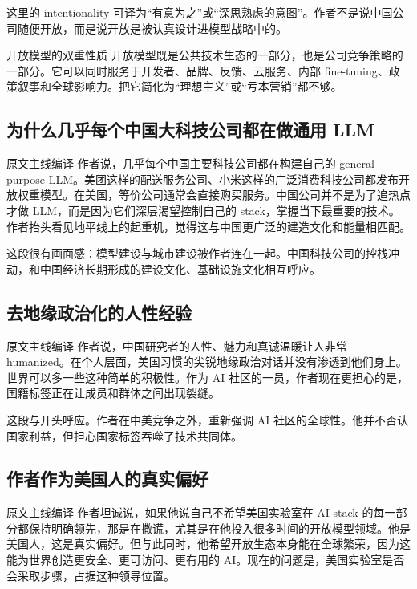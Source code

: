 这里的 intentionality 可译为``有意为之''或``深思熟虑的意图''。作者不是说中国公司随便开放，而是说开放是被认真设计进模型战略中的。

\begin{importantbox}{开放模型的双重性质}
开放模型既是公共技术生态的一部分，也是公司竞争策略的一部分。它可以同时服务于开发者、品牌、反馈、云服务、内部 fine-tuning、政策叙事和全球影响力。把它简化为``理想主义''或``亏本营销''都不够。
\end{importantbox}

\subsection{为什么几乎每个中国大科技公司都在做通用 LLM}

\begin{translationbox}{原文主线编译}
作者说，几乎每个中国主要科技公司都在构建自己的 general purpose LLM。美团这样的配送服务公司、小米这样的广泛消费科技公司都发布开放权重模型。在美国，等价公司通常会直接购买服务。中国公司并不是为了追热点才做 LLM，而是因为它们深层渴望控制自己的 stack，掌握当下最重要的技术。作者抬头看见地平线上的起重机，觉得这与中国更广泛的建造文化和能量相匹配。
\end{translationbox}

这段很有画面感：模型建设与城市建设被作者连在一起。中国科技公司的控栈冲动，和中国经济长期形成的建设文化、基础设施文化相互呼应。

\subsection{去地缘政治化的人性经验}

\begin{translationbox}{原文主线编译}
作者说，中国研究者的人性、魅力和真诚温暖让人非常 humanized。在个人层面，美国习惯的尖锐地缘政治对话并没有渗透到他们身上。世界可以多一些这种简单的积极性。作为 AI 社区的一员，作者现在更担心的是，国籍标签正在让成员和群体之间出现裂缝。
\end{translationbox}

这段与开头呼应。作者在中美竞争之外，重新强调 AI 社区的全球性。他并不否认国家利益，但担心国家标签吞噬了技术共同体。

\subsection{作者作为美国人的真实偏好}

\begin{translationbox}{原文主线编译}
作者坦诚说，如果他说自己不希望美国实验室在 AI stack 的每一部分都保持明确领先，那是在撒谎，尤其是在他投入很多时间的开放模型领域。他是美国人，这是真实偏好。但与此同时，他希望开放生态本身能在全球繁荣，因为这能为世界创造更安全、更可访问、更有用的 AI。现在的问题是，美国实验室是否会采取步骤，占据这种领导位置。
\end{translationbox}

